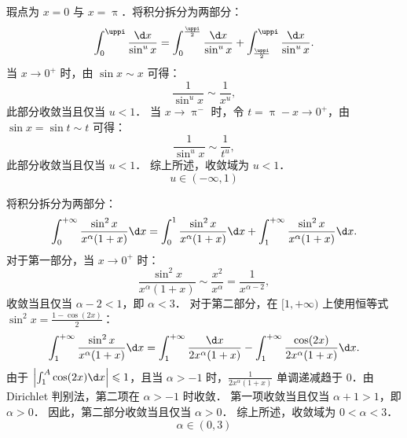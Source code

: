 \begin{solution}

    瑕点为 $x = 0$ 与 $x = \uppi$．将积分拆分为两部分：
    \begin{equation}
        \int_0^{\uppi} \frac{\d x}{\sin^u x} = \int_0^{\frac{\uppi}{2}} \frac{\d x}{\sin^u x} + \int_{\frac{\uppi}{2}}^{\uppi} \frac{\d x}{\sin^u x}.
    \end{equation}
    当 $x \to 0^+$ 时，由 $\sin x \sim x$ 可得：
    \begin{equation}
        \frac{1}{\sin^u x} \sim \frac{1}{x^u},
    \end{equation}
    此部分收敛当且仅当 $u < 1$．
    当 $x \to \uppi^-$ 时，令 $t = \uppi - x \to 0^+$，由 $\sin x = \sin t \sim t$ 可得：
    \begin{equation}
        \frac{1}{\sin^u x} \sim \frac{1}{t^u},
    \end{equation}
    此部分收敛当且仅当 $u < 1$．
    综上所述，收敛域为 $u < 1$．
    \begin{equation}
        \boxed{u \in (-\infty, 1)}
    \end{equation}


    将积分拆分为两部分：
    \begin{equation}
        \int_0^{+\infty} \frac{\sin^2 x}{x^\alpha(1+x)} \d x = \int_0^1 \frac{\sin^2 x}{x^\alpha(1+x)} \d x + \int_1^{+\infty} \frac{\sin^2 x}{x^\alpha(1+x)} \d x.
    \end{equation}
    对于第一部分，当 $x \to 0^+$ 时：
    \begin{equation}
        \frac{\sin^2 x}{x^\alpha(1+x)} \sim \frac{x^2}{x^\alpha} = \frac{1}{x^{\alpha-2}},
    \end{equation}
    收敛当且仅当 $\alpha - 2 < 1$，即 $\alpha < 3$．
    对于第二部分，在 $[1, +\infty)$ 上使用恒等式 $\sin^2 x = \frac{1 - \cos(2x)}{2}$：
    \begin{equation}
        \int_1^{+\infty} \frac{\sin^2 x}{x^\alpha(1+x)} \d x = \int_1^{+\infty} \frac{\d x}{2 x^\alpha (1+x)} - \int_1^{+\infty} \frac{\cos(2x)}{2 x^\alpha(1+x)} \d x.
    \end{equation}
    由于 $\left| \int_1^A \cos(2x) \d x \right| \leqslant 1$，且当 $\alpha > -1$ 时，$\frac{1}{2x^\alpha(1+x)}$ 单调递减趋于 0．由 Dirichlet 判别法，第二项在 $\alpha > -1$ 时收敛．
    第一项收敛当且仅当 $\alpha + 1 > 1$，即 $\alpha > 0$．
    因此，第二部分收敛当且仅当 $\alpha > 0$．
    综上所述，收敛域为 $0 < \alpha < 3$．
    \begin{equation}
        \boxed{\alpha \in (0, 3)}
    \end{equation}


\end{solution}
